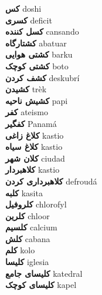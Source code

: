 \textbf{ کس  } doshi \\
\textbf{ کسری  } deficit \\
\textbf{ کسل کننده  } cansando \\
\textbf{ کشتارگاه  } abatuar \\
\textbf{ کشتی هوایی  } barku \\
\textbf{ کشتی کوچک  } boto \\
\textbf{ کشف کردن  } deskubrí \\
\textbf{ کشیدن  } trèk \\
\textbf{ کشیش ناحیه  } papi \\
\textbf{ کفر  } ateismo \\
\textbf{ کفگیر  } Panamá \\
\textbf{ کلاغ زاغی  } kastio \\
\textbf{ کلاغ سیاه  } kastio \\
\textbf{ کلان شهر  } ciudad \\
\textbf{ کلاهبردار  } kastio \\
\textbf{ کلاهبرداری کردن  } defroudá \\
\textbf{ کلبه  } kasita \\
\textbf{ کلروفیل  } chlorofyl \\
\textbf{ کلرین  } chloor \\
\textbf{ کلسیم  } calcium \\
\textbf{ کلش  } cabana \\
\textbf{ کلم  } kolo \\
\textbf{ کلیسا  } iglesia \\
\textbf{ کلیسای جامع  } katedral \\
\textbf{ کلیسای کوچک  } kapel \\
